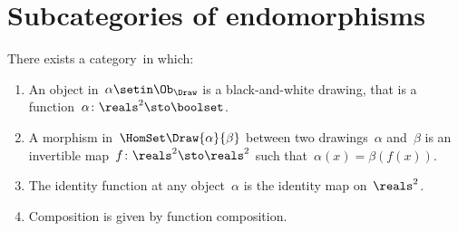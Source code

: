 
\section{Subcategories of endomorphisms}
\label{sec:Draw}

\index{\Draw}
\begin{definition}[Drawings]
    \label{def:Draw}
    There exists a category~\Draw in which:
    \begin{enumerate}
        \item An object in~$\alpha\setin \Ob_\Draw$ is a black-and-white drawing,
              that is a function~$\alpha \colon \reals^2 \sto \boolset$.
        \item A morphism in~$\HomSet\Draw{\alpha}{\beta}$ between two drawings~$\alpha$ and~$\beta$ is an invertible map~$f\colon \reals^2 \sto \reals^2$ such that~$\alpha(x) = \beta(f(x))$.
        \item The identity function at any object~$\alpha$ is the identity map on~$\reals^2$.
        \item Composition is given by function composition.
    \end{enumerate}
\end{definition}

